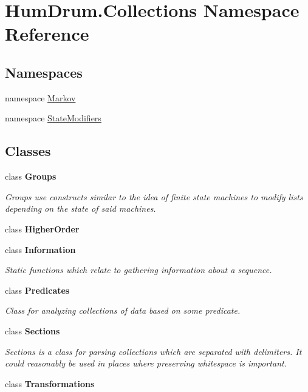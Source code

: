 \hypertarget{namespaceHumDrum_1_1Collections}{}\section{Hum\+Drum.\+Collections Namespace Reference}
\label{namespaceHumDrum_1_1Collections}
\subsection*{Namespaces}
\begin{DoxyCompactItemize}
\item 
namespace \hyperlink{namespaceHumDrum_1_1Collections_1_1Markov}{Markov}
\item 
namespace \hyperlink{namespaceHumDrum_1_1Collections_1_1StateModifiers}{State\+Modifiers}
\end{DoxyCompactItemize}
\subsection*{Classes}
\begin{DoxyCompactItemize}
\item 
class {\bfseries Groups}
\begin{DoxyCompactList}\small\item\em Groups use constructs similar to the idea of finite state machines to modify lists depending on the state of said machines. \end{DoxyCompactList}\item 
class {\bfseries Higher\+Order}
\item 
class {\bfseries Information}
\begin{DoxyCompactList}\small\item\em Static functions which relate to gathering information about a sequence. \end{DoxyCompactList}\item 
class {\bfseries Predicates}
\begin{DoxyCompactList}\small\item\em Class for analyzing collections of data based on some predicate. \end{DoxyCompactList}\item 
class {\bfseries Sections}
\begin{DoxyCompactList}\small\item\em Sections is a class for parsing collections which are separated with delimiters. It could reasonably be used in places where preserving whitespace is important. \end{DoxyCompactList}\item 
class {\bfseries Transformations}
\end{DoxyCompactItemize}
